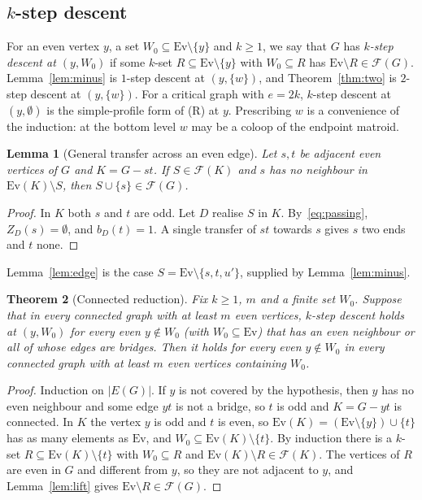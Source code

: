 \documentclass[11pt]{amsart}
\newtheorem{theorem}{Theorem}
\newtheorem{lemma}[theorem]{Lemma}
\theoremstyle{definition}
\newcommand{\cF}{\mathcal F}
\newcommand{\Ev}{\mathrm{Ev}}
\begin{document}
\subsection*{$k$-step descent}

For an even vertex $y$, a set $W_0\subseteq\Ev\setminus\{y\}$ and $k\ge1$, we say that $G$ has
\emph{$k$-step descent at $(y,W_0)$} if some $k$-set $R\subseteq\Ev\setminus\{y\}$ with $W_0\subseteq R$
has $\Ev\setminus R\in\cF(G)$. Lemma~\ref{lem:minus} is $1$-step descent at $(y,\{w\})$, and
Theorem~\ref{thm:two} is $2$-step descent at $(y,\{w\})$. For a critical graph with $e=2k$, $k$-step
descent at $(y,\emptyset)$ is the simple-profile form of (R) at $y$. Prescribing $w$ is a convenience
of the induction: at the bottom level $w$ may be a coloop of the endpoint matroid.

\begin{lemma}[General transfer across an even edge]\label{lem:transfer}
Let $s,t$ be adjacent even vertices of $G$ and $K=G-st$. If $S\in\cF(K)$ and $s$ has no neighbour in
$\Ev(K)\setminus S$, then $S\cup\{s\}\in\cF(G)$.
\end{lemma}

\begin{proof}
In $K$ both $s$ and $t$ are odd. Let $D$ realise $S$ in $K$. By~\eqref{eq:passing}, $Z_D(s)=\emptyset$,
and $b_D(t)=1$. A single transfer of $st$ towards $s$ gives $s$ two ends and $t$ none.
\end{proof}

Lemma~\ref{lem:edge} is the case $S=\Ev\setminus\{s,t,u'\}$, supplied by Lemma~\ref{lem:minus}.

\begin{theorem}[Connected reduction]\label{thm:reduction}
Fix $k\ge1$, $m$ and a finite set $W_0$. Suppose that in every connected graph with at least $m$ even
vertices, $k$-step descent holds at $(y,W_0)$ for every even $y\notin W_0$ (with $W_0\subseteq\Ev$)
that has an even neighbour or all of whose edges are bridges. Then it holds for every even
$y\notin W_0$ in every connected graph with at least $m$ even vertices containing $W_0$.
\end{theorem}

\begin{proof}
Induction on $|E(G)|$. If $y$ is not covered by the hypothesis, then $y$ has no even neighbour and some
edge $yt$ is not a bridge, so $t$ is odd and $K=G-yt$ is connected. In $K$ the vertex $y$ is odd and
$t$ is even, so $\Ev(K)=(\Ev\setminus\{y\})\cup\{t\}$ has as many elements as $\Ev$, and
$W_0\subseteq\Ev(K)\setminus\{t\}$. By induction there is a $k$-set $R\subseteq\Ev(K)\setminus\{t\}$
with $W_0\subseteq R$ and $\Ev(K)\setminus R\in\cF(K)$. The vertices of $R$ are even in $G$ and
different from $y$, so they are not adjacent to $y$, and Lemma~\ref{lem:lift} gives
$\Ev\setminus R\in\cF(G)$.
\end{proof}
\end{document}
